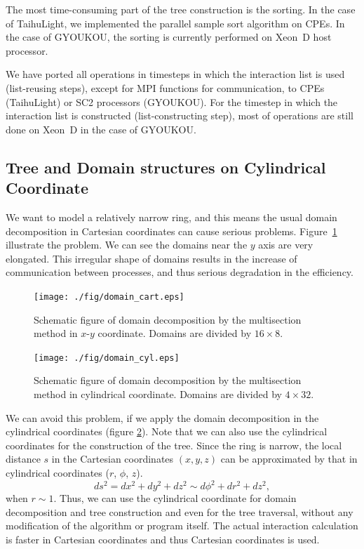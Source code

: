 \documentclass[conference]{IEEEtran}
\begin{document}
The most time-consuming part of the tree construction is the
sorting. In the case of TaihuLight, we implemented the parallel sample sort
algorithm\cite{cmsort} on CPEs. In the case of GYOUKOU, the sorting is currently
performed on Xeon~D host processor.

We have ported all operations in timesteps in which the interaction
list is used (list-reusing steps), except for MPI functions for
communication, to CPEs (TaihuLight) or SC2 processors (GYOUKOU). For
the timestep in which the interaction list is constructed
(list-constructing step), most of operations are still done on Xeon~D
in the case of GYOUKOU.

\subsection{Tree and Domain structures on Cylindrical Coordinate}
\label{subsec:cylcoord}

We want to model a relatively narrow ring, and this means the usual
domain decomposition in Cartesian coordinates can cause serious
problems. Figure~\ref{fig:domain_cart} illustrate the problem. We
can see the domains near the $y$ axis are very elongated. This
irregular shape of domains results in the increase of communication
between processes, and thus serious degradation in the efficiency. 

\begin{figure}
  \centering \texttt{[image: ./fig/domain\_cart.eps]}
  \caption{Schematic figure of domain decomposition by the multisection
    method in $x$-$y$ coordinate. Domains are divided by $16 \times 8$.}
  \label{fig:domain_cart}
\end{figure}

\begin{figure}
  \centering
    \texttt{[image: ./fig/domain\_cyl.eps]}
  \caption{Schematic figure of domain decomposition by the multisection
    method in cylindrical coordinate. Domains are divided by $4 \times 32$.}
  \label{fig:domain_cyl}
\end{figure}

We can avoid this problem, if we apply the domain decomposition 
in the  cylindrical coordinates (figure  \ref{fig:domain_cyl}).
Note that we can also use the  cylindrical coordinates for the
construction of the tree.  Since
the ring is narrow, the local distance $s$ in the Cartesian coordinates
$(x, y, z)$ can be approximated by that in cylindrical coordinates
($r$, $\phi$, $z$).
\begin{equation}
  \label{eq:metric}
  ds^2 = dx^2 + dy^2 + dz^2 \sim d\phi ^2 + dr^2 + dz^2,
\end{equation}
when $r \sim 1$. Thus,
we can use the cylindrical coordinate
for domain decomposition and tree
construction and even for the tree traversal,  without any modification of the algorithm or program
itself. The actual interaction calculation is faster in Cartesian
coordinates and thus Cartesian coordinates is used.
\end{document}

